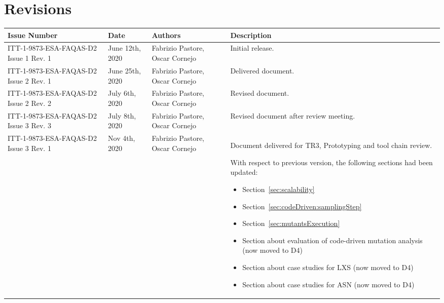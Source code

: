 
\section*{Revisions}
\label{sec:revisions}


\setlength\LTleft{0pt}
\setlength\LTright{0pt}
\tiny 
\begin{longtable}{|p{2cm}|p{1cm}|p{1.5cm}|p{9cm}|@{}}
\label{table:codeoperators} \\
\hline
\textbf{Issue Number}&\textbf{Date}&\textbf{Authors}&\textbf{Description}\\
\hline
ITT-1-9873-ESA-FAQAS-D2
Issue 1 Rev. 1&
June 12th, 2020&
Fabrizio Pastore, Oscar Cornejo&
\begin{minipage}{8cm}
Initial release.
\end{minipage}
\\
\hline
ITT-1-9873-ESA-FAQAS-D2
Issue 2 Rev. 1&
June 25th, 2020&
Fabrizio Pastore, Oscar Cornejo&
\begin{minipage}{8cm}
Delivered document.
\end{minipage}
\\
\hline
ITT-1-9873-ESA-FAQAS-D2
Issue 2 Rev. 2&
July 6th, 2020&
Fabrizio Pastore, Oscar Cornejo&
\begin{minipage}{8cm}
Revised document.
\end{minipage}
\\
\hline
ITT-1-9873-ESA-FAQAS-D2
Issue 3 Rev. 3&
July 8th, 2020&
Fabrizio Pastore, Oscar Cornejo&
\begin{minipage}{8cm}
Revised document after review meeting.
\end{minipage}
\\
\hline
ITT-1-9873-ESA-FAQAS-D2
Issue 3 Rev. 1&
Nov 4th, 2020&
Fabrizio Pastore, Oscar Cornejo&
\begin{minipage}{8cm}
Document delivered for TR3, Prototyping and tool chain review.

With respect to previous version, the following sections had been updated:
\begin{itemize}
\item Section~\ref{sec:scalability}
\item Section~\ref{sec:codeDriven:samplingStep}
\item Section~\ref{sec:mutantsExecution}
\item Section about evaluation of code-driven mutation analysis (now moved to D4)
\item Section about case studies for LXS (now moved to D4)
\item Section about case studies for ASN (now moved to D4)
\end{itemize}


\end{minipage}
\end{longtable}
